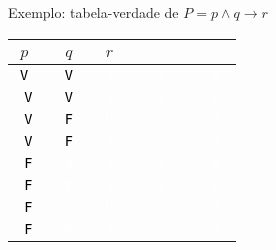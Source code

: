 \begin{frame}[fragile]{Exemplo: tabela-verdade de $P = p \land q \to r$}

    \begin{table}
        \centering
        \begin{tabular}{>{\tt}c>{\tt}c>{\tt}c>{\tt}c>{\tt}c}
            \hline
            $p$ & $q$ & $r$ & \textcolor{white}{$p\land q$} & \textcolor{white}{$P$}\\
            \hline
            \textcolor{black}{V} & \textcolor{black}{V} & \textcolor{white}{V} & \textcolor{white}{V} & \textcolor{white}{V} \\
            \hline
            \textcolor{black}{V} & \textcolor{black}{V} & \textcolor{white}{V} & \textcolor{white}{V} & \textcolor{white}{V} \\
            \hline
            \textcolor{black}{V} & \textcolor{black}{F} & \textcolor{white}{V} & \textcolor{white}{V} & \textcolor{white}{V} \\
            \hline
            \textcolor{black}{V} & \textcolor{black}{F} & \textcolor{white}{V} & \textcolor{white}{V} & \textcolor{white}{V} \\
            \hline
            \textcolor{black}{F} & \textcolor{white}{V} & \textcolor{white}{V} & \textcolor{white}{V} & \textcolor{white}{V} \\
            \hline
            \textcolor{black}{F} & \textcolor{white}{V} & \textcolor{white}{V} & \textcolor{white}{V} & \textcolor{white}{V} \\
            \hline
            \textcolor{black}{F} & \textcolor{white}{V} & \textcolor{white}{V} & \textcolor{white}{V} & \textcolor{white}{V} \\
            \hline
            \textcolor{black}{F} & \textcolor{white}{V} & \textcolor{white}{V} & \textcolor{white}{V} & \textcolor{white}{V} \\
            \hline
        \end{tabular}
    \end{table}
\end{frame}


